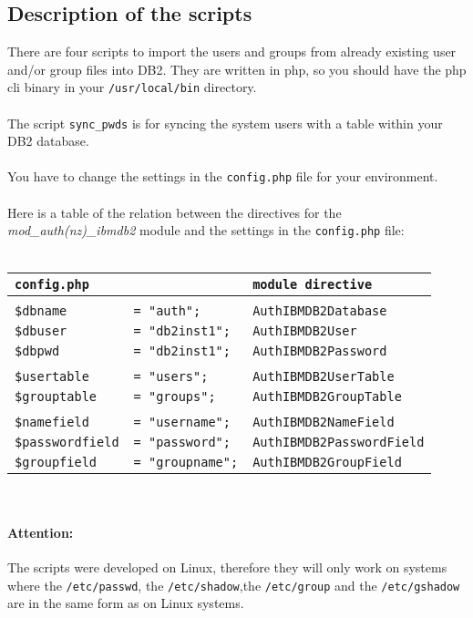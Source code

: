 \documentclass[11pt,a4paper]{article}
\begin{document}
\subsection{Description of the scripts}
There are four scripts to import the users and groups from already existing user and/or group files into DB2. They are written in php, so you should have the php cli binary in your {\tt /usr/local/bin} directory.\\
\\
The script {\tt sync\_pwds} is for syncing the system users with a table within your DB2 database.\\
\\
You have to change the settings in the {\tt config.php} file for your environment.\\
\\
Here is a table of the relation between the directives for the \emph{mod\_auth(nz)\_ibmdb2} module
and the settings in the {\tt config.php} file:\\
\\
\begin{tabular}{@{} lll @{}}
{\tt config.php} & & {\tt module directive}\\
\hline
& & \\
{\tt \$dbname} & {\tt = "auth";} & {\tt AuthIBMDB2Database} \\
{\tt \$dbuser} & {\tt = "db2inst1";} & {\tt AuthIBMDB2User} \\
{\tt \$dbpwd} & {\tt = "db2inst1";} & {\tt AuthIBMDB2Password} \\
& & \\
{\tt \$usertable} & {\tt = "users";} & {\tt AuthIBMDB2UserTable} \\
{\tt \$grouptable} & {\tt = "groups";} & {\tt AuthIBMDB2GroupTable} \\
& & \\
{\tt \$namefield} & {\tt = "username";} & {\tt AuthIBMDB2NameField} \\	
{\tt \$passwordfield} & {\tt = "password";} & {\tt AuthIBMDB2PasswordField} \\
{\tt \$groupfield} & {\tt = "groupname";} & {\tt AuthIBMDB2GroupField} \\
\end{tabular}
\\
\paragraph{Attention:}{The scripts were developed on Linux, therefore they will only work on systems where the {\tt /etc/passwd}, the {\tt /etc/shadow},the {\tt /etc/group} and the {\tt /etc/gshadow} are in the same form as on Linux systems.}
\end{document}
